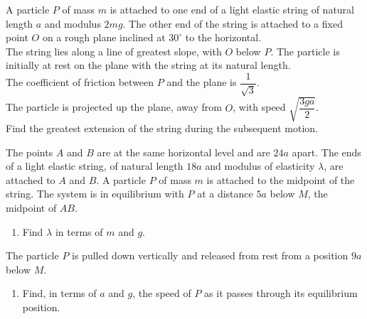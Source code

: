 \documentclass[leqno]{article}
\begin{document}
\begin{enumerate}[
  label=\textbf{\arabic*.},
  leftmargin=*,
  topsep=0pt,
  partopsep=0pt,
  parsep=0pt
]
\newpage

\questionitem

A particle $P$ of mass $m$ is attached to one end of a light elastic string of natural length $a$ and modulus $2mg$. The other end of the string is attached to a fixed point $O$ on a rough plane inclined at $30^\circ$ to the horizontal. \\

The string lies along a line of greatest slope, with $O$ below $P$. The particle is initially at rest on the plane with the string at its natural length. \\

The coefficient of friction between $P$ and the plane is $\dfrac{1}{\sqrt{3}}$. \\

The particle is projected up the plane, away from $O$, with speed $\sqrt{\dfrac{3ga}{2}}$. \\

Find the greatest extension of the string during the subsequent motion.  \\

\newpage

\questionitem

The points $A$ and $B$ are at the same horizontal level and are $24a$ apart. The ends of a light elastic string, of natural length $18a$ and modulus of elasticity $\lambda$, are attached to $A$ and $B$. A particle $P$ of mass $m$ is attached to the midpoint of the string. The system is in equilibrium with $P$ at a distance $5a$ below $M$, the midpoint of $AB$. \\
\begin{enumerate}[label=\textbf{(\alph*)}]
  \item Find $\lambda$ in terms of $m$ and $g$.  \\
\end{enumerate}
The particle $P$ is pulled down vertically and released from rest from a position $9a$ below $M$. \\
\begin{enumerate}[label=\textbf{(\alph*)}, resume]
  \item Find, in terms of $a$ and $g$, the speed of $P$ as it passes through its equilibrium position.  \\
\end{enumerate}


\end{enumerate}
\end{document}
